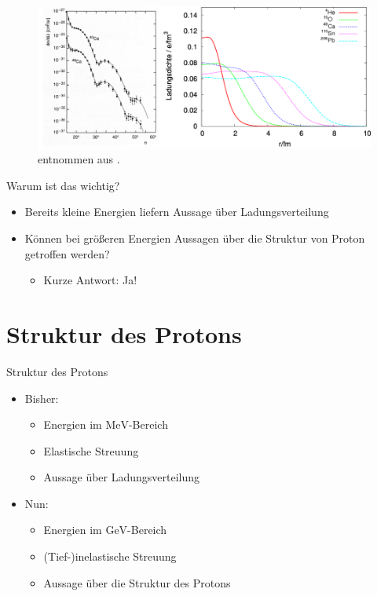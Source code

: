 \documentclass[aspectratio=1610, 9pt]{beamer}
\begin{document}
\begin{frame}
  \begin{figure}
    \centering
    \includegraphics[scale=0.4]{images/Ladungsverteilung.png}
    \caption{entnommen aus \cite{KET}.}
  \end{figure}
\end{frame}

\begin{frame}{Warum ist das wichtig?}
  \begin{itemize}
    \item{Bereits kleine Energien liefern Aussage über Ladungsverteilung}
    \item{Können bei größeren Energien Aussagen über die Struktur von Proton getroffen werden?}
    \begin{itemize}
      \item{Kurze Antwort: Ja!}
    \end{itemize}
  \end{itemize}
\end{frame}

\section{Struktur des Protons}


\begin{frame}{Struktur des Protons}
  \begin{itemize}
    \item{Bisher:}
    \begin{itemize}
      \item{Energien im $\mathrm{MeV}$-Bereich }
      \item{Elastische Streuung}
      \item{Aussage über Ladungsverteilung}
    \end{itemize}
    \item{Nun:}
    \begin{itemize}
      \item{Energien im $\mathrm{GeV}$-Bereich}
      \item{(Tief-)inelastische Streuung}
      \item{Aussage über die Struktur des Protons}
    \end{itemize}
  \end{itemize}
\end{frame}
\end{document}
